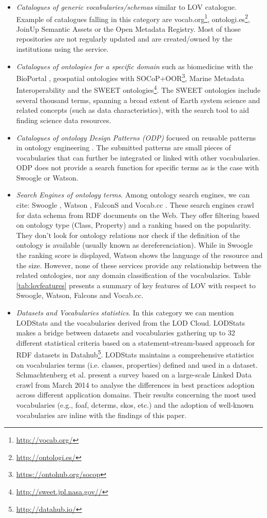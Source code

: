 \documentclass{iosart2c}
\begin{document}
\begin{itemize}
 \item \textit{Catalogues of generic vocabularies/schemas} similar to LOV catalogue. Example of catalogues falling in this category are vocab.org\footnote{\url{http://vocab.org/}}, ontologi.es\footnote{\url{http://ontologi.es/}}, JoinUp Semantic Assets or the Open Metadata Registry. Most of those repositories are not regularly updated and are created/owned by the institutions using the service.
 \item \textit{Catalogues of ontologies for a specific domain} such as biomedicine with the BioPortal \cite{bioportal11}, geospatial ontologies with SOCoP+OOR\footnote{\url{https://ontohub.org/socop}}, Marine Metadata Interoperability and the SWEET \cite{sweet05} ontologies\footnote{\url{http://sweet.jpl.nasa.gov//}}. The SWEET ontologies include several thousand terms, spanning a broad extent of Earth system science and related concepts (such as data characteristics), with the search tool to aid finding science data resources. 
 \item \textit{Catalogues of ontology Design Patterns (ODP)} focused on reusable patterns in ontology engineering \cite{presutti08}. The submitted patterns are small pieces of vocabularies that can further be integrated or linked with other vocabularies. ODP does not provide a search function for specific terms as is the case with Swoogle or Watson.
 \item \textit{Search Engines of ontology terms}. Among ontology search engines, we can cite: Swoogle \cite{finin2005swoogle}, Watson \cite{d2007watson,Sabou07}, FalconS \cite{cheng2008falcons} and Vocab.cc \cite{vocabcc2013}. These search engines crawl for data schema from RDF documents on the Web. They offer filtering based on ontology type (Class, Property) and a ranking based on the popularity. They don't look for ontology relations nor check if the definition of the ontology is available (usually known as dereferenciation). While in Swoogle the ranking score is displayed, Watson shows the language of the resource and the size. However, none of these services provide any relationship between the related ontologies, nor any domain classification of the vocabularies. Table \ref{tab:lovfeatures} presents a summary of key features of LOV with respect to Swoogle, Watson, Falcons and Vocab.cc.
 \item \textit{Datasets and Vocabularies statistics}. In this category we can mention LODStats \cite{demter-2012-ekaw} and the vocabularies derived from the LOD Cloud.  LODStats makes a bridge between datasets and vocabularies gathering up to 32 different statistical criteria based on a statement-stream-based approach for RDF datasets in Datahub\footnote{\url{http://datahub.io/}}. LODStats maintains a comprehensive statistics on vocabularies terms (i.e. classes, properties) defined and used in a dataset. Schmachtenberg et al. \cite{max2014} present a survey based on a large-scale Linked Data crawl from March 2014 to analyse the differences in best practices adoption across different application domains. Their results concerning the most used vocabularies (e.g., foaf, dcterms, skos, etc.) and the adoption of well-known vocabularies are inline with the findings of this paper.

\end{itemize}
\end{document}
